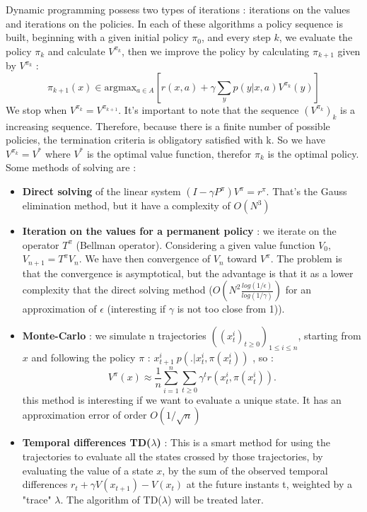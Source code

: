 \documentclass[conference]{IEEEtran}
\begin{document}
Dynamic programming possess two types of iterations : iterations on the values and iterations on the policies. 
In each of these algorithms a policy sequence is built,
beginning with a given initial policy $\pi_0$, and every step $k$, we evaluate the policy $\pi_k$ and calculate $V^{\pi_k}$, then we improve the policy by calculating $\pi_{k+1}$ given by $V^{\pi_k}$ :
\[ \pi_{k+1}(x) \in \mbox{arg} \mbox{max}_{a \in A}[r(x,a) + \gamma\sum_yp(y|x,a)V^{\pi_k}(y)] 	\]
We stop when $V^{\pi_k} = V^{\pi_{k+1}}$.
It's important to note that the sequence $(V^{\pi_k})_k$ is a increasing sequence. Therefore, because there is a finite number of possible policies, the termination criteria is obligatory satisfied with k. So we have $V^{\pi_k} = V^*$ where $V^*$ is the optimal value function, therefor $\pi_k$ is the optimal policy.
Some methods of solving are :
\begin{itemize}
 \item \textbf{Direct solving} of the linear system $(I-\gamma P^{\pi})V^{\pi} = r^{\pi}$. That's the Gauss elimination method, but it have a complexity of $O(N^3)$
 \item \textbf{Iteration on the values for a permanent policy} : we iterate on the operator $T^{\pi}$ (Bellman operator). Considering a given value function $V_0$, $V_{n+1} = T^{\pi} V_n$. 
We have then convergence of $V_n$ toward $V^{\pi}$. The problem is that the convergence is asymptotical, but the advantage is that it as a lower complexity that the direct solving method ($O(N^2 \frac{log(1/\epsilon)}{log(1/\gamma)})$ for an approximation of $\epsilon$ (interesting if $\gamma$ is not too close from 1)).
 \item \textbf{Monte-Carlo} : we simulate n trajectories $((x_t^i)_{t \geqslant 0})_{1 \leqslant i \leqslant n}$, starting from $x$ and following the policy $\pi$ : $x_{t+1}^i ~ p(.|x_t^i,\pi(x^i_t))$ , so :
 \begin{equation*}
 V^{\pi}(x) \approx \frac{1}{n} \sum_{i=1}^n \sum_{t \geqslant 0} \gamma^t r(x^i_t, \pi(x^i_t)).
 \end{equation*}
 this method is interesting if we want to evaluate a unique state. It has an approximation error of order $O(1/\sqrt{n})$
 \item \textbf{Temporal differences TD($\lambda$)} : This is a smart method for using the trajectories to evaluate all the states crossed by those trajectories, by evaluating the value of a state $x$, by the sum of the observed temporal differences $r_t+\gamma V(x_{t+1}) - V(x_t)$ at the future instants t, weighted by a "trace" $\lambda$. The algorithm of TD($\lambda$) will be treated later.
\end{itemize}
\end{document}
